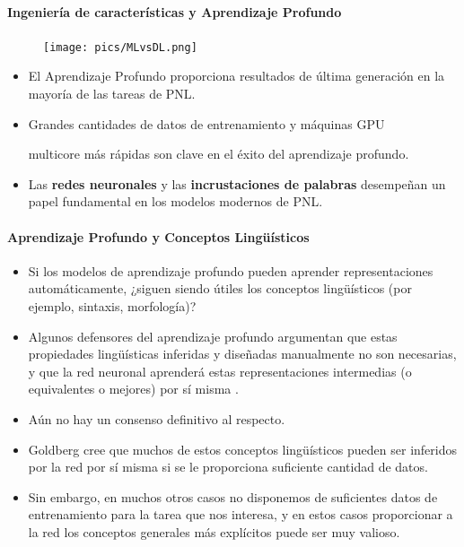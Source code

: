 \documentclass{book}
\begin{document}
\paragraph{Ingeniería de características y Aprendizaje Profundo}

\begin{figure}[h]
   \texttt{[image: pics/MLvsDL.png]}
\end{figure}

\begin{itemize}
   \item El Aprendizaje Profundo proporciona resultados de última generación en la mayoría de las tareas de PNL.
   \item Grandes cantidades de datos de entrenamiento y máquinas GPU

 multicore más rápidas son clave en el éxito del aprendizaje profundo.
   \item Las \textbf{redes neuronales} y las \textbf{incrustaciones de palabras} desempeñan un papel fundamental en los modelos modernos de PNL.

\end{itemize}

\paragraph{Aprendizaje Profundo y Conceptos Lingüísticos}
\begin{itemize}
   \item Si los modelos de aprendizaje profundo pueden aprender representaciones automáticamente, ¿siguen siendo útiles los conceptos lingüísticos (por ejemplo, sintaxis, morfología)?
   \item Algunos defensores del aprendizaje profundo argumentan que estas propiedades lingüísticas inferidas y diseñadas manualmente no son necesarias, y que la red neuronal aprenderá estas representaciones intermedias (o equivalentes o mejores) por sí misma \cite{goldberg2016primer}.
   \item Aún no hay un consenso definitivo al respecto.
   \item Goldberg cree que muchos de estos conceptos lingüísticos pueden ser inferidos por la red por sí misma si se le proporciona suficiente cantidad de datos.
   \item Sin embargo, en muchos otros casos no disponemos de suficientes datos de entrenamiento para la tarea que nos interesa, y en estos casos proporcionar a la red los conceptos generales más explícitos puede ser muy valioso.
\end{itemize}
\end{document}
